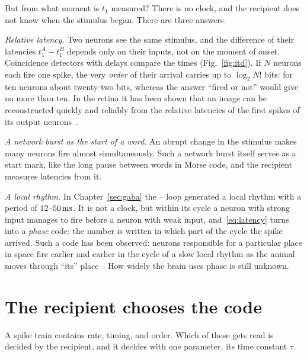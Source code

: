 But from what moment is $t_1$ measured? There is no clock, and the recipient does not know when the stimulus began. There are three answers.

\emph{Relative latency.} Two neurons see the same stimulus, and the difference of their latencies $t_1^A-t_1^B$ depends only on their inputs, not on the moment of onset. Coincidence detectors with delays compare the times (Fig.~\ref{fig:itd}). If $N$ neurons each fire one spike, the very \emph{order} of their arrival carries up to $\log_2N!$ bits: for ten neurons about twenty-two bits, whereas the answer ``fired or not'' would give no more than ten. In the retina it has been shown that an image can be reconstructed quickly and reliably from the relative latencies of the first spikes of its output neurons~\cite{Gollisch2008}.

\emph{A network burst as the start of a word.} An abrupt change in the stimulus makes many neurons fire almost simultaneously. Such a network burst itself serves as a start mark, like the long pause between words in Morse code, and the recipient measures latencies from it.

\emph{A local rhythm.} In Chapter~\ref{sec:gaba} the -- loop generated a local rhythm with a period of $12$--$50\,\text{ms}$. It is not a clock, but within its cycle a neuron with strong input manages to fire before a neuron with weak input, and~\eqref{eq:latency} turns into a \emph{phase} code: the number is written in which part of the cycle the spike arrived. Such a code has been observed: neurons responsible for a particular place in space fire earlier and earlier in the cycle of a slow local rhythm as the animal moves through ``its'' place~\cite{OKeefe1993}. How widely the brain uses phase is still unknown.

\section{The recipient chooses the code}

A spike train contains rate, timing, and order. Which of these gets read is decided by the recipient, and it decides with one parameter, its time constant $\tau$.

